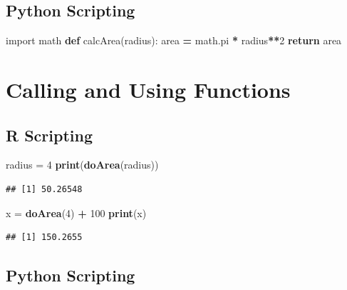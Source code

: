 \documentclass[]{book}
\newenvironment{Shaded}{\begin{snugshade}}{\end{snugshade}}
\newcommand{\KeywordTok}[1]{\textcolor[rgb]{0.13,0.29,0.53}{\textbf{#1}}}
\newcommand{\DecValTok}[1]{\textcolor[rgb]{0.00,0.00,0.81}{#1}}
\newcommand{\StringTok}[1]{\textcolor[rgb]{0.31,0.60,0.02}{#1}}
\newcommand{\ImportTok}[1]{#1}
\newcommand{\ControlFlowTok}[1]{\textcolor[rgb]{0.13,0.29,0.53}{\textbf{#1}}}
\newcommand{\OperatorTok}[1]{\textcolor[rgb]{0.81,0.36,0.00}{\textbf{#1}}}
\newcommand{\NormalTok}[1]{#1}
\theoremstyle{definition}
\theoremstyle{definition}
\theoremstyle{definition}
\theoremstyle{remark}
\begin{document}
\subsection{Python Scripting}\label{python-scripting-1}

\begin{Shaded}
\begin{Highlighting}[]
\ImportTok{import}\NormalTok{ math}
\KeywordTok{def}\NormalTok{ calcArea(radius):}
\NormalTok{  area }\OperatorTok{=}\NormalTok{ math.pi }\OperatorTok{*}\NormalTok{ radius}\OperatorTok{**}\DecValTok{2}
  \ControlFlowTok{return}\NormalTok{ area}
\end{Highlighting}
\end{Shaded}

\section{Calling and Using Functions}\label{calling-and-using-functions}

\subsection{R Scripting}\label{r-scripting-2}

\begin{Shaded}
\begin{Highlighting}[]
\NormalTok{radius =}\StringTok{ }\DecValTok{4}
\KeywordTok{print}\NormalTok{(}\KeywordTok{doArea}\NormalTok{(radius))}
\end{Highlighting}
\end{Shaded}

\begin{verbatim}
## [1] 50.26548
\end{verbatim}

\begin{Shaded}
\begin{Highlighting}[]
\NormalTok{x =}\StringTok{ }\KeywordTok{doArea}\NormalTok{(}\DecValTok{4}\NormalTok{) }\OperatorTok{+}\StringTok{ }\DecValTok{100}
\KeywordTok{print}\NormalTok{(x)}
\end{Highlighting}
\end{Shaded}

\begin{verbatim}
## [1] 150.2655
\end{verbatim}

\subsection{Python Scripting}\label{python-scripting-2}
\end{document}
